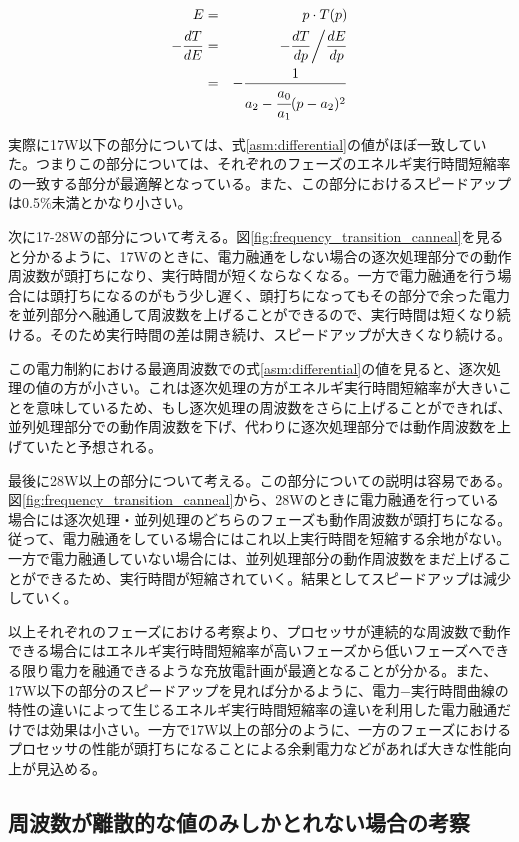 \begin{eqnarray}
E &=& p \cdot T(p)\\
-\frac{dT}{dE} &=& -\frac{dT}{dp} \bigg/ \frac{dE}{dp}\\
&=& -\frac{1}{a_2 - \cfrac{a_0}{a_1}( p-a_2)^2} \label{asm:differential}
\end{eqnarray}

実際に17W以下の部分については、式\ref{asm:differential}の値がほぼ一致していた。つまりこの部分については、それぞれのフェーズのエネルギ実行時間短縮率の一致する部分が最適解となっている。また、この部分におけるスピードアップは0.5\%未満とかなり小さい。

次に17-28Wの部分について考える。図\ref{fig:frequency_transition_canneal}を見ると分かるように、17Wのときに、電力融通をしない場合の逐次処理部分での動作周波数が頭打ちになり、実行時間が短くならなくなる。一方で電力融通を行う場合には頭打ちになるのがもう少し遅く、頭打ちになってもその部分で余った電力を並列部分へ融通して周波数を上げることができるので、実行時間は短くなり続ける。そのため実行時間の差は開き続け、スピードアップが大きくなり続ける。

この電力制約における最適周波数での式\ref{asm:differential}の値を見ると、逐次処理の値の方が小さい。これは逐次処理の方がエネルギ実行時間短縮率が大きいことを意味しているため、もし逐次処理の周波数をさらに上げることができれば、並列処理部分での動作周波数を下げ、代わりに逐次処理部分では動作周波数を上げていたと予想される。

最後に28W以上の部分について考える。この部分についての説明は容易である。図\ref{fig:frequency_transition_canneal}から、28Wのときに電力融通を行っている場合には逐次処理・並列処理のどちらのフェーズも動作周波数が頭打ちになる。従って、電力融通をしている場合にはこれ以上実行時間を短縮する余地がない。一方で電力融通していない場合には、並列処理部分の動作周波数をまだ上げることができるため、実行時間が短縮されていく。結果としてスピードアップは減少していく。

以上それぞれのフェーズにおける考察より、プロセッサが連続的な周波数で動作できる場合にはエネルギ実行時間短縮率が高いフェーズから低いフェーズへできる限り電力を融通できるような充放電計画が最適となることが分かる。また、17W以下の部分のスピードアップを見れば分かるように、電力−実行時間曲線の特性の違いによって生じるエネルギ実行時間短縮率の違いを利用した電力融通だけでは効果は小さい。一方で17W以上の部分のように、一方のフェーズにおけるプロセッサの性能が頭打ちになることによる余剰電力などがあれば大きな性能向上が見込める。

\subsection{周波数が離散的な値のみしかとれない場合の考察}
\label{subsec:discreet}

